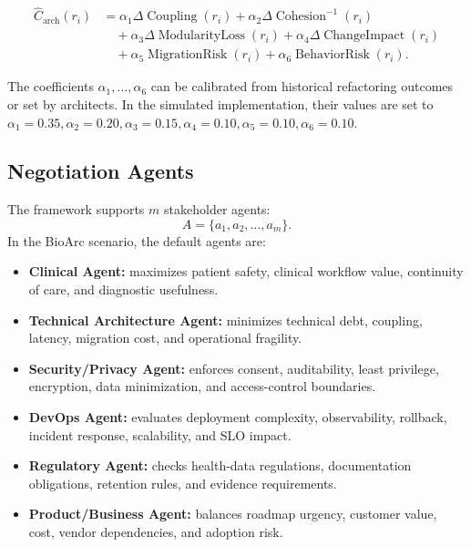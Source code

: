 \documentclass[english,preprint,nonatbib]{elsarticle}
\begin{document}
\begin{equation}
\begin{aligned}
\widehat{C}_{\mathrm{arch}}(r_i)
&= \alpha_1 \Delta \operatorname{Coupling}(r_i)
 + \alpha_2 \Delta \operatorname{Cohesion}^{-1}(r_i) \\
&\quad + \alpha_3 \Delta \operatorname{ModularityLoss}(r_i)
 + \alpha_4 \Delta \operatorname{ChangeImpact}(r_i) \\
&\quad + \alpha_5 \operatorname{MigrationRisk}(r_i)
 + \alpha_6 \operatorname{BehaviorRisk}(r_i).
\end{aligned}
\label{eq:arch-cost}
\end{equation}

The coefficients $\alpha_1,\ldots,\alpha_6$ can be calibrated from historical refactoring outcomes or set by architects.
In the simulated implementation, their values are set to $\alpha_1=0.35, \alpha_2=0.20, \alpha_3=0.15, \alpha_4=0.10, \alpha_5=0.10, \alpha_6=0.10$.

\subsection{Negotiation Agents}

The framework supports $m$ stakeholder agents:
\begin{equation}
    A = \{a_1, a_2, \ldots, a_m\}.
\end{equation}
In the BioArc scenario, the default agents are:

\begin{itemize}[leftmargin=2em]
  \item \textbf{Clinical Agent:} maximizes patient safety, clinical workflow value, continuity of care, and diagnostic usefulness.
  \item \textbf{Technical Architecture Agent:} minimizes technical debt, coupling, latency, migration cost, and operational fragility.
  \item \textbf{Security/Privacy Agent:} enforces consent, auditability, least privilege, encryption, data minimization, and access-control boundaries.
  \item \textbf{DevOps Agent:} evaluates deployment complexity, observability, rollback, incident response, scalability, and SLO impact.
  \item \textbf{Regulatory Agent:} checks health-data regulations, documentation obligations, retention rules, and evidence requirements.
  \item \textbf{Product/Business Agent:} balances roadmap urgency, customer value, cost, vendor dependencies, and adoption risk.
\end{itemize}
\end{document}
